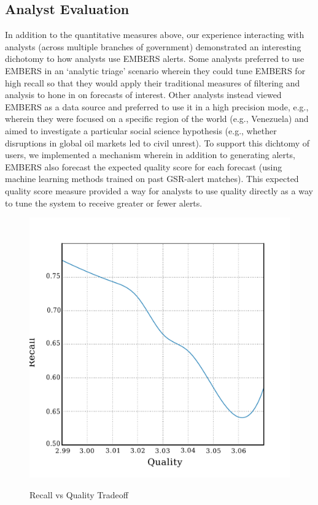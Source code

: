 
\subsection{Analyst Evaluation}
In addition to the quantitative measures above, our experience interacting with analysts (across multiple
branches of government) demonstrated
an interesting dichotomy to how analysts use EMBERS alerts. Some analysts preferred to use EMBERS in an
`analytic triage' scenario wherein they could tune EMBERS for high recall so that they would apply their
traditional measures of filtering and analysis to hone in on forecasts of interest. Other analysts 
instead viewed EMBERS as a data source and preferred to use it in a high precision mode, e.g., wherein they
were focused on a specific region of the world (e.g., Venezuela) and aimed to investigate a particular
social science hypothesis (e.g., whether disruptions in global oil markets led to civil unrest). 
To support this dichtomy of users, we implemented a mechanism wherein in addition to generating alerts, EMBERS
also forecast the expected quality score for each forecast (using machine learning methods trained on
past GSR-alert matches). This expected quality score measure provided a way for analysts to use quality
directly as a way to tune the system to receive greater or fewer alerts.

\begin{figure}
\centering
\includegraphics[scale=0.4]{figures/cu/recallVsQS.pdf}
\label{fig:recallvsQS}
\caption{Recall vs Quality Tradeoff}
\end{figure}

